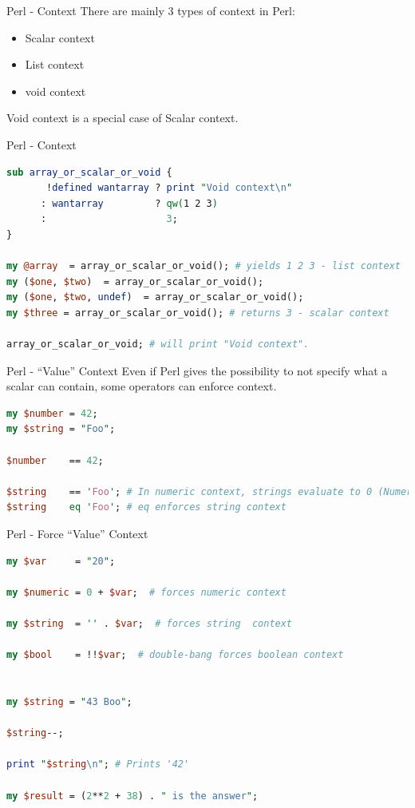 \documentclass[10pt]{beamer}
\begin{document}
\begin{frame}[fragile]{Perl - Context}
There are mainly 3 types of context in Perl:

\begin{itemize}
    \item Scalar context
    \item List context
    \item void context
\end{itemize}

Void context is a special case of Scalar context.

\end{frame}

\begin{frame}[fragile]{Perl - Context}
\begin{lstlisting}[language=perl,caption={Full example at examples/01\_intro/1\_context.pl},captionpos=b]
sub array_or_scalar_or_void {
       !defined wantarray ? print "Void context\n"
      : wantarray         ? qw(1 2 3)
      :                     3;
}

my @array  = array_or_scalar_or_void(); # yields 1 2 3 - list context
my ($one, $two)  = array_or_scalar_or_void();
my ($one, $two, undef)  = array_or_scalar_or_void();
my $three = array_or_scalar_or_void(); # returns 3 - scalar context

array_or_scalar_or_void; # will print "Void context".
\end{lstlisting}

\end{frame}


\begin{frame}[fragile]{Perl - ``Value'' Context}
Even if Perl gives the possibility to not specify what a scalar can contain, some operators can enforce context.
\begin{lstlisting}[language=perl]
my $number = 42;
my $string = "Foo";

$number    == 42;

$string    == 'Foo'; # In numeric context, strings evaluate to 0 (Numeric Coercion)
$string    eq 'Foo'; # eq enforces string context
\end{lstlisting}


\end{frame}


\begin{frame}[fragile]{Perl - Force ``Value'' Context}

\begin{lstlisting}[language=perl]
my $var     = "20";

my $numeric = 0 + $var;  # forces numeric context

my $string  = '' . $var;  # forces string  context

my $bool    = !!$var;  # double-bang forces boolean context


my $string = "43 Boo";

$string--;

print "$string\n"; # Prints '42'

my $result = (2**2 + 38) . " is the answer";
\end{lstlisting}

\end{frame}
\end{document}

